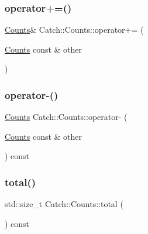 \hypertarget{struct_catch_1_1_counts_a322a89475cd2cc039140ef371e973677}{}\label{struct_catch_1_1_counts_a322a89475cd2cc039140ef371e973677} 
\subsubsection{\texorpdfstring{operator+=()}{operator+=()}}
{\footnotesize\ttfamily \hyperlink{struct_catch_1_1_counts}{Counts}\& Catch\+::\+Counts\+::operator+= (\begin{DoxyParamCaption}\item[{\hyperlink{struct_catch_1_1_counts}{Counts} const \&}]{other }\end{DoxyParamCaption})\hspace{0.3cm}{\ttfamily [inline]}}

\hypertarget{struct_catch_1_1_counts_aaa10666f559057e3e860d2a5a6fae4c4}{}\label{struct_catch_1_1_counts_aaa10666f559057e3e860d2a5a6fae4c4} 
\subsubsection{\texorpdfstring{operator-\/()}{operator-()}}
{\footnotesize\ttfamily \hyperlink{struct_catch_1_1_counts}{Counts} Catch\+::\+Counts\+::operator-\/ (\begin{DoxyParamCaption}\item[{\hyperlink{struct_catch_1_1_counts}{Counts} const \&}]{other }\end{DoxyParamCaption}) const\hspace{0.3cm}{\ttfamily [inline]}}

\hypertarget{struct_catch_1_1_counts_a94f969c09cf52d1339c085c9603cd1d3}{}\label{struct_catch_1_1_counts_a94f969c09cf52d1339c085c9603cd1d3} 
\subsubsection{\texorpdfstring{total()}{total()}}
{\footnotesize\ttfamily std\+::size\+\_\+t Catch\+::\+Counts\+::total (\begin{DoxyParamCaption}{ }\end{DoxyParamCaption}) const\hspace{0.3cm}{\ttfamily [inline]}}



